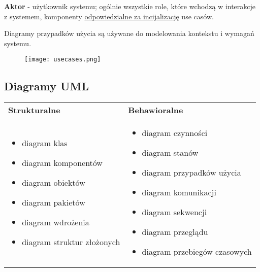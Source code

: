 \documentclass[../main.tex]{subfiles}
\begin{document}
    \textbf{Aktor} - użytkownik systemu; ogólnie wszystkie role, które wchodzą w interakcje z systemem, komponenty \underline{odpowiedzialne
    za incijalizację} use casów.

    Diagramy przypadków użycia są używane do modelowania kontekstu i wymagań systemu.

    \begin{figure}[H]
        \texttt{[image: usecases.png]}
    \end{figure}

    \subsection{Diagramy UML}
    \begin{table}[H]
        \begin{center}
            \begin{tabular}{  p{8cm} p{8cm} }
                \toprule
                \textbf{Strukturalne} & \textbf{Behawioralne} \\

                \cmidrule(r){1-1}\cmidrule(r){2-2}

                \begin{itemize}
                    \item diagram klas
                    \item diagram komponentów
                    \item diagram obiektów
                    \item diagram pakietów
                    \item diagram wdrożenia
                    \item diagram struktur złożonych
                \end{itemize}
                &
                \begin{itemize}
                    \item diagram czynności
                    \item diagram stanów
                    \item diagram przypadków użycia
                    \item diagram komunikacji
                    \item diagram sekwencji
                    \item diagram przeglądu
                    \item diagram przebiegów czasowych
                \end{itemize}
                \\

                \bottomrule
            \end{tabular}
        \end{center}
    \end{table}
\end{document}
